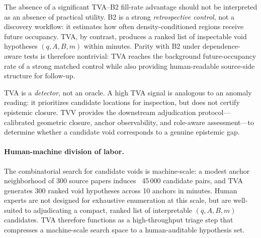 \documentclass[11pt,twocolumn]{article}
\begin{document}
The absence of a significant TVA--B2 fill-rate advantage should not be interpreted
as an absence of practical utility. B2 is a strong \emph{retrospective control}, not
a discovery workflow: it estimates how often density-conditioned regions receive future
occupancy. TVA, by contrast, produces a ranked list of inspectable void hypotheses
$(q,A,B,m)$ within minutes. Parity with B2 under dependence-aware tests is therefore
nontrivial: TVA reaches the background future-occupancy rate of a strong matched
control while also providing human-readable source-side structure for follow-up.

TVA is a \emph{detector}, not an oracle. A high TVA signal is analogous to an anomaly
reading: it prioritizes candidate locations for inspection, but does not certify
epistemic closure. TVV provides the downstream adjudication protocol---calibrated
geometric closure, anchor observability, and role-aware assessment---to determine
whether a candidate void corresponds to a genuine epistemic gap.

\paragraph{Human-machine division of labor.}
The combinatorial search for candidate voids is machine-scale: a modest anchor
neighborhood of 300 source papers induces ~45\,000 candidate pairs, and TVA
generates 300 ranked void hypotheses across 10 anchors in minutes. Human experts
are not designed for exhaustive enumeration at this scale, but are well-suited to
adjudicating a compact, ranked list of interpretable $(q,A,B,m)$ candidates.
TVA therefore functions as a high-throughput triage step that compresses a
machine-scale search space to a human-auditable hypothesis set.

\begin{table}[h!]
\centering\small
\caption{Division of labor.}
\end{table}
\end{document}
